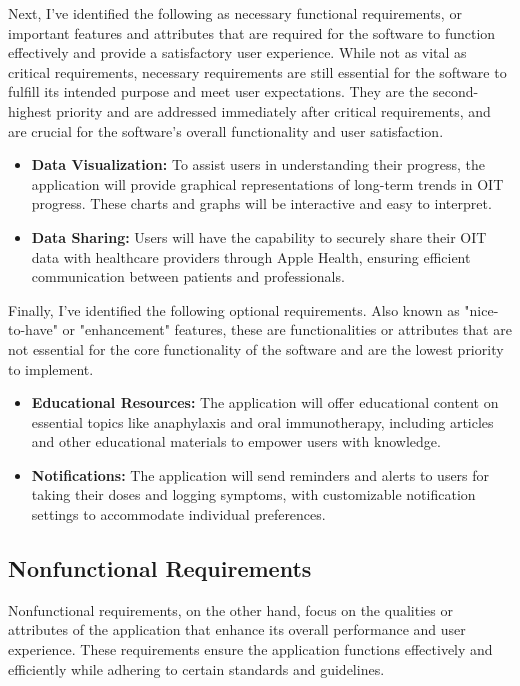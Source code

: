 Next, I've identified the following as necessary functional requirements, or important features and attributes that are required for the software to function effectively and provide a satisfactory user experience. While not as vital as critical requirements, necessary requirements are still essential for the software to fulfill its intended purpose and meet user expectations.
They are the second-highest priority and are addressed immediately after critical requirements, and are crucial for the software's overall functionality and user satisfaction.

\begin{itemize}
    \item \textbf{Data Visualization:} To assist users in understanding their progress, the application will provide graphical representations of long-term trends in OIT progress. These charts and graphs will be interactive and easy to interpret.
    \item \textbf{Data Sharing:} Users will have the capability to securely share their OIT data with healthcare providers through Apple Health, ensuring efficient communication between patients and professionals.
\end{itemize}

Finally, I've identified the following optional requirements. Also known as "nice-to-have" or "enhancement" features, these are functionalities or attributes that are not essential for the core functionality of the software and are the lowest priority to implement.

\begin{itemize}
    \item \textbf{Educational Resources:} The application will offer educational content on essential topics like anaphylaxis and oral immunotherapy, including articles and other educational materials to empower users with knowledge.
    \item \textbf{Notifications:} The application will send reminders and alerts to users for taking their doses and logging symptoms, with customizable notification settings to accommodate individual preferences.
\end{itemize}

\subsection{Nonfunctional Requirements}

Nonfunctional requirements, on the other hand, focus on the qualities or attributes of the application that enhance its overall performance and user experience. These requirements ensure the application functions effectively and efficiently while adhering to certain standards and guidelines. 

